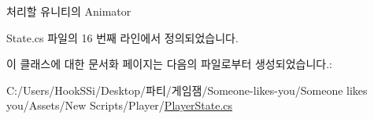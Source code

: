 처리할 유니티의 Animator 



State.\+cs 파일의 16 번째 라인에서 정의되었습니다.


\begin{DoxyCode}{0}

\end{DoxyCode}


이 클래스에 대한 문서화 페이지는 다음의 파일로부터 생성되었습니다.\+:\begin{DoxyCompactItemize}
\item 
C\+:/\+Users/\+Hook\+S\+Si/\+Desktop/파티/게임잼/\+Someone-\/likes-\/you/\+Someone likes you/\+Assets/\+New Scripts/\+Player/\mbox{\hyperlink{_player_state_8cs}{Player\+State.\+cs}}\end{DoxyCompactItemize}
